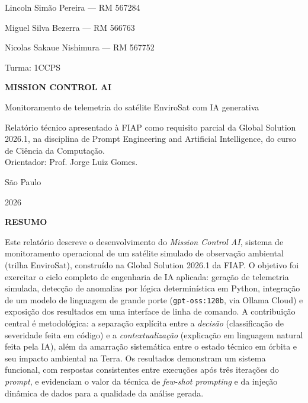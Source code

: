 \documentclass[12pt,a4paper]{article}
\begin{document}
\begin{titlepage}
\begin{center}
{\normalsize Lincoln Simão Pereira --- RM 567284\par}
{\normalsize Miguel Silva Bezerra --- RM 566763\par}
{\normalsize Nicolas Sakaue Nishimura --- RM 567752\par}
{\normalsize Turma: 1CCPS\par}
\vspace{3cm}
{\LARGE\bfseries MISSION CONTROL AI\par}
\vspace{0.3cm}
{\large Monitoramento de telemetria do satélite EnviroSat com IA generativa\par}
\end{center}
\vspace{2cm}
\begin{flushright}
\begin{minipage}{0.55\textwidth}
\onehalfspacing\small
Relatório técnico apresentado à FIAP como requisito parcial da Global Solution 2026.1, na disciplina de Prompt Engineering and Artificial Intelligence, do curso de Ciência da Computação.\\[0.5cm]
Orientador: Prof. Jorge Luiz Gomes.
\end{minipage}
\end{flushright}
\vfill
\begin{center}
{\normalsize São Paulo\par}
{\normalsize 2026\par}
\end{center}
\end{titlepage}

\begin{center}\textbf{RESUMO}\end{center}
\noindent
Este relatório descreve o desenvolvimento do \textit{Mission Control AI}, sistema de monitoramento operacional de um satélite simulado de observação ambiental (trilha EnviroSat), construído na Global Solution 2026.1 da FIAP. O objetivo foi exercitar o ciclo completo de engenharia de IA aplicada: geração de telemetria simulada, detecção de anomalias por lógica determinística em Python, integração de um modelo de linguagem de grande porte (\texttt{gpt-oss:120b}, via Ollama Cloud) e exposição dos resultados em uma interface de linha de comando. A contribuição central é metodológica: a separação explícita entre a \textit{decisão} (classificação de severidade feita em código) e a \textit{contextualização} (explicação em linguagem natural feita pela IA), além da amarração sistemática entre o estado técnico em órbita e seu impacto ambiental na Terra. Os resultados demonstram um sistema funcional, com respostas consistentes entre execuções após três iterações do \textit{prompt}, e evidenciam o valor da técnica de \textit{few-shot prompting} e da injeção dinâmica de dados para a qualidade da análise gerada.
\end{document}
